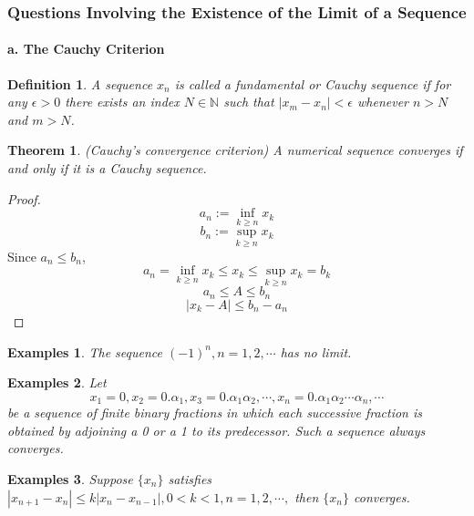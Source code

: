 \documentclass[a4paper,12pt]{article} %
\newtheorem{definition}{Definition}[section]
\newtheorem{theorem}{Theorem}[section]
\newtheorem{example}{Examples}
\begin{document}
\subsubsection{Questions Involving the Existence of the Limit of a Sequence}
\paragraph{{\rm \textbf{ a. The Cauchy Criterion}}}
\begin{definition}
    A sequence ${x_n}$ is called a \textit{fundamental or Cauchy} sequence 
    if for any $\epsilon > 0$ there exists an index $N \in \mathbb{N}$
    such that $|x_m - x_n| < \epsilon$ whenever $n > N$ and $m > N$.
\end{definition}
\begin{theorem}{(Cauchy's convergence criterion)}
    A numerical sequence converges if and only if it is a Cauchy sequence.
\end{theorem}
\begin{proof}
    \[a_n := \inf_{k\ge n} x_k\]
    \[b_n:= \sup_{k\ge n} x_k\]
    Since $a_n \le b_n$, 
    \[a_n = \inf_{k\ge n} x_k \le x_k \le \sup_{k\ge n} x_k = b_k\]
    \[a_n \le A \le b_n\]
    \[\left|x_k - A\right| \le b_n - a_n\]
\end{proof}
\begin{example}
    The sequence $(-1)^n, n = 1,2,\cdots$ has no limit.
\end{example}
\begin{example}
    Let \[x_1 = 0, x_2 = 0.\alpha_1, x_3 = 0.\alpha_1\alpha_2, \cdots, x_n = 0.\alpha_1\alpha_2\cdots\alpha_n, \cdots\]
    be a sequence of finite binary fractions in which each successive
    fraction is obtained by adjoining a 0 or a 1 to its predecessor. 
    Such a sequence always converges.
\end{example}

\begin{example}
    Suppose $\{x_n\}$ satisfies $\displaystyle |x_{n+1} - x_{n}| \le k|x_n - x_{n-1}
    |, 0 < k < 1, n=1,2,\cdots,$
    then $\{x_n\}$ converges.
\end{example}
\end{document}
